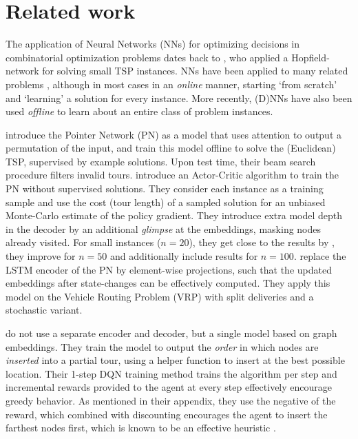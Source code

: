 
\section{Related work}
\label{sec:related_work}
The application of Neural Networks (NNs) for optimizing decisions in combinatorial optimization problems dates back to \citet{hopfield1985neural}, who applied a Hopfield-network for solving small TSP instances. NNs have been applied to many related problems \citep{smith1999neural}, although in most cases in an \emph{online} manner, starting `from scratch' and `learning' a solution for every instance. More recently, (D)NNs have also been used \emph{offline} to learn about an entire class of problem instances.

\citet{vinyals2015pointer} introduce the Pointer Network (PN) as a model that uses attention to output a permutation of the input, and train this model offline to solve the (Euclidean) TSP, supervised by example solutions. Upon test time, their beam search procedure filters invalid tours. \citet{bello2016neural} introduce an Actor-Critic algorithm to train the PN without supervised solutions. They consider each instance as a training sample and use the cost (tour length) of a sampled solution for an unbiased Monte-Carlo estimate of the policy gradient. They introduce extra model depth in the decoder by an additional \emph{glimpse} \citep{vinyals2015order} at the embeddings, masking nodes already visited. For small instances ($n = 20$), they get close to the results by \mbox{\citet{vinyals2015pointer}}, they improve for $n=50$ and additionally include results for $n = 100$. \citet{nazari2018reinforcement} replace the LSTM encoder of the PN by element-wise projections, such that the updated embeddings after state-changes can be effectively computed. They apply this model on the Vehicle Routing Problem (VRP) with split deliveries and a stochastic variant.

\citet{dai2017learning} do not use a separate encoder and decoder, but a single model based on graph embeddings. They train the model to output the \emph{order} in which nodes are \emph{inserted} into a partial tour, using a helper function to insert at the best possible location. Their 1-step DQN \citep{mnih2015human} training method trains the algorithm per step and incremental rewards provided to the agent at every step effectively encourage greedy behavior. As mentioned in their appendix, they use the negative of the reward, which combined with discounting encourages the agent to insert the farthest nodes first, which is known to be an effective heuristic \citep{rosenkrantz2009analysis}.

